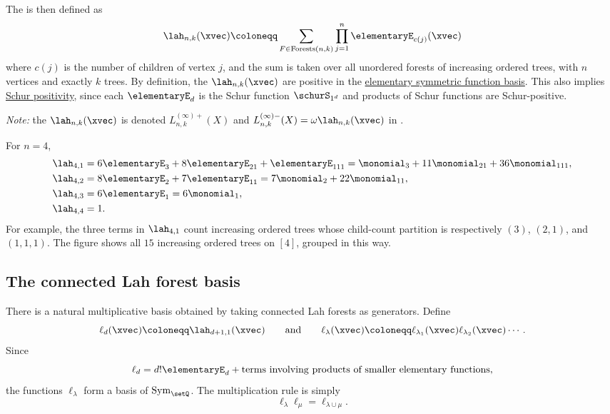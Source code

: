 The  is then defined as
\[
 \lah_{n,k}(\xvec) \coloneqq \sum_{F \in \mathrm{Forests}(n,k)} \prod_{j=1}^n
\elementaryE_{c(j)}(\xvec)
\]
where $c(j)$ is the number of children of vertex $j$,
and the sum is taken over all unordered forests of increasing ordered trees,
with $n$ vertices and exactly $k$ trees.
By definition, the $\lah_{n,k}(\xvec)$ are positive
in the \hyperref[elementaryE]{elementary symmetric function basis}.
This also implies \hyperref[schurPositivity]{Schur positivity}, since each
$\elementaryE_d$ is the Schur function $\schurS_{1^d}$ and products of Schur
functions are Schur-positive.

\emph{Note:} the $\lah_{n,k}(\xvec)$ is denoted $L^{(\infty)+}_{n,k}(X)$
and $L^{(\infty)-}_{n,k}(X) = \omega \lah_{n,k}(\xvec)$ in
\cite{PetreolleSokal2019x}.

\begin{example*}[Lah symmetric functions for $n=4$]
For $n=4$,
\begin{align*}
\lah_{4,1} &= 6 \elementaryE_3 + 8 \elementaryE_{21} + \elementaryE_{111} =
\monomial_{3} + 11\monomial_{21}+36\monomial_{111}, \\
\lah_{4,2} &= 8 \elementaryE_2 + 7 \elementaryE_{11} =
7\monomial_{2} + 22\monomial_{11}, \\
\lah_{4,3} &= 6 \elementaryE_{1}= 6\monomial_{1}, \\
\lah_{4,4} &= 1.
\end{align*}
For example, the three terms in $\lah_{4,1}$ count increasing ordered trees
whose child-count partition is respectively $(3)$, $(2,1)$, and $(1,1,1)$.
The figure shows all $15$ increasing ordered trees on $[4]$, grouped in
this way.
\begin{figure}
\end{figure}
\end{example*}

\subsection[lahForestBasis]{The connected Lah forest basis}

There is a natural multiplicative basis obtained by taking connected Lah
forests as generators.  Define
\[
  \ell_d(\xvec) \coloneqq \lah_{d+1,1}(\xvec)
  \qquad\text{and}\qquad
  \ell_\lambda(\xvec) \coloneqq
  \ell_{\lambda_1}(\xvec)\ell_{\lambda_2}(\xvec)\dotsm .
\]
Since
\[
  \ell_d = d!\elementaryE_d
  + \text{terms involving products of smaller elementary functions},
\]
the functions $\ell_\lambda$ form a basis of $\mathrm{Sym}_{\setQ}$.
The multiplication rule is simply
\[
  \ell_\lambda \ell_\mu = \ell_{\lambda \cup \mu}.
\]


